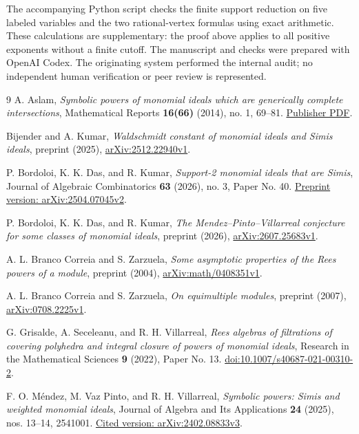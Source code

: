\documentclass[11pt]{article}
\begin{document}
The accompanying Python script checks the finite support reduction
on five labeled variables and the two rational-vertex formulas using
exact arithmetic. These calculations are supplementary: the proof
above applies to all positive exponents without a finite cutoff.
The manuscript and checks were prepared with OpenAI Codex. The
originating system performed the internal audit; no independent
human verification or peer review is represented.

\begin{thebibliography}{9}
A. Aslam, \emph{Symbolic powers of monomial ideals which are generically
complete intersections}, Mathematical Reports \textbf{16(66)} (2014),
no. 1, 69--81.
\href{https://imar.ro/journals/Mathematical_Reports/Pdfs/2014/1/6.pdf}{Publisher PDF}.

Bijender and A. Kumar, \emph{Waldschmidt constant of monomial ideals
and Simis ideals}, preprint (2025),
\href{https://arxiv.org/abs/2512.22940v1}{arXiv:2512.22940v1}.

P. Bordoloi, K. K. Das, and R. Kumar, \emph{Support-2 monomial ideals
that are Simis}, Journal of Algebraic Combinatorics \textbf{63}
(2026), no. 3, Paper No. 40.
\href{https://arxiv.org/abs/2504.07045v2}{Preprint version: arXiv:2504.07045v2}.

P. Bordoloi, K. K. Das, and R. Kumar, \emph{The Mendez--Pinto--Villarreal
conjecture for some classes of monomial ideals}, preprint (2026),
\href{https://arxiv.org/abs/2607.25683v1}{arXiv:2607.25683v1}.

A. L. Branco Correia and S. Zarzuela, \emph{Some asymptotic properties
of the Rees powers of a module}, preprint (2004),
\href{https://arxiv.org/abs/math/0408351v1}{arXiv:math/0408351v1}.

A. L. Branco Correia and S. Zarzuela, \emph{On equimultiple modules},
preprint (2007),
\href{https://arxiv.org/abs/0708.2225v1}{arXiv:0708.2225v1}.

G. Grisalde, A. Seceleanu, and R. H. Villarreal, \emph{Rees algebras
of filtrations of covering polyhedra and integral closure of powers
of monomial ideals}, Research in the Mathematical Sciences
\textbf{9} (2022), Paper No. 13.
\href{https://doi.org/10.1007/s40687-021-00310-2}{doi:10.1007/s40687-021-00310-2}.

F. O. M\'endez, M. Vaz Pinto, and R. H. Villarreal,
\emph{Symbolic powers: Simis and weighted monomial ideals},
Journal of Algebra and Its Applications \textbf{24} (2025),
nos. 13--14, 2541001.
\href{https://arxiv.org/abs/2402.08833v3}{Cited version: arXiv:2402.08833v3}.
\end{thebibliography}
\end{document}

